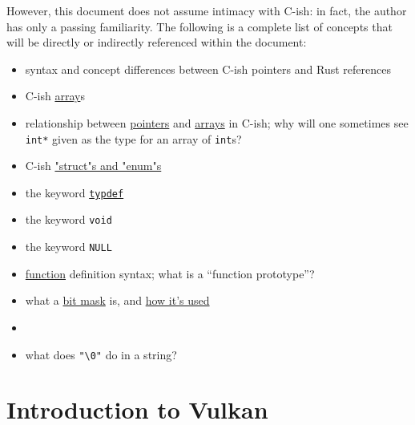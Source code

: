 \documentclass[12pt,letterpaper]{article}
\newcommand{\inquotes}[1]{``#1''}	%
\newcommand{\cil}[1]{\texttt{#1}}
\begin{document}
    However, this document does not assume intimacy with C-ish: in fact, the author has only a passing familiarity. The following is a complete list of concepts that will be directly or indirectly referenced within the document:
		\begin{itemize}
            \item syntax and concept differences between C-ish pointers and Rust references
            
			\item C-ish \href{https://en.wikibooks.org/wiki/C_Programming/Arrays_and_strings}{array}s
            
            \item relationship between  \href{https://en.wikibooks.org/wiki/C_Programming/Pointers_and_arrays}{pointers} and \href{https://en.wikibooks.org/wiki/C_Programming/Pointers_and_arrays#Pointers_and_Arrays}{arrays} in C-ish; why will one sometimes see \cil{int*} given as the type for an array of \cil{int}s?
            
            \item C-ish \href{https://en.wikibooks.org/wiki/C_Programming/Advanced_data_types}{"struct"s and "enum"s}
            
            \item the keyword \href{https://en.wikibooks.org/wiki/C_Programming/Advanced_data_types}{\cil{typdef}}
			
            \item the keyword \cil{void}
            
            \item the keyword \cil{NULL}
            
			\item \href{https://en.wikibooks.org/wiki/C_Programming/Procedures_and_functions}{function} definition syntax; what is a \inquotes{function prototype}? 
			
			\item what a \href{https://en.wikipedia.org/wiki/Mask_(computing)}{bit mask} is, and \href{https://stackoverflow.com/questions/10493411/what-is-bit-masking}{how it's used}
            
            \item \item what does \texttt{"\textbackslash0"} do in a string? 
		\end{itemize}
    
    
\section{Introduction to Vulkan}
\end{document}

